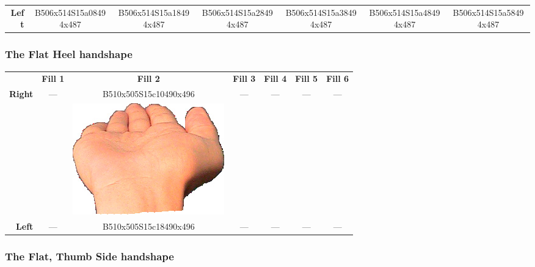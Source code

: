 \documentclass{article}
\begin{document}
\begin{center}
\begin{tabular}{r*{6}{c}}
\textbf{Left}&
B506x514S15a08494x487&
B506x514S15a18494x487&
B506x514S15a28494x487&
B506x514S15a38494x487&
B506x514S15a48494x487&
B506x514S15a58494x487\\
\end{tabular}
\end{center}

\subsubsection{The Flat Heel handshape}

\begin{center}
\begin{tabular}{r*{6}{c}}
&\textbf{Fill 1}&\textbf{Fill 2}&\textbf{Fill 3}&\textbf{Fill 4}&\textbf{Fill 5}&\textbf{Fill 6}\\
\multirow{2}{*}{\textbf{Right}}&
\multirow{2}{*}{---}&
B510x505S15c10490x496&
\multirow{2}{*}{---}&
\multirow{2}{*}{---}&
\multirow{2}{*}{---}&
\multirow{2}{*}{---}\\
&
&
\includegraphics[scale=0.1]{images/05-11-2.jpg}\\
\textbf{Left}&
---&
B510x505S15c18490x496&
---&
---&
---&
---\\
\end{tabular}
\end{center}

\subsubsection{The Flat, Thumb Side handshape}
\end{document}
